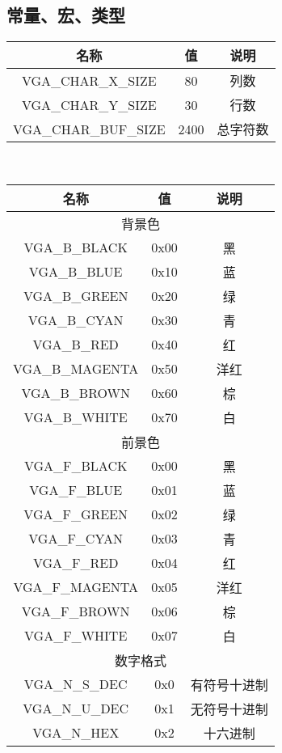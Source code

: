 \subsection{常量、宏、类型}
\noindent\begin{tabular}{|c|c|c|}
    \hline
    名称 & 值 & 说明\\\hline
    VGA\_CHAR\_X\_SIZE & 80 & 列数\\\hline
    VGA\_CHAR\_Y\_SIZE & 30 & 行数\\\hline
    VGA\_CHAR\_BUF\_SIZE & 2400 & 总字符数\\\hline
\end{tabular}\\
\begin{tabular}{|c|c|c|}
    \hline
    名称 & 值 & 说明\\\hline
    \multicolumn{3}{|c|}{背景色}\\\hline
    VGA\_B\_BLACK & 0x00 & 黑\\\hline
    VGA\_B\_BLUE & 0x10 & 蓝\\\hline
    VGA\_B\_GREEN & 0x20 & 绿\\\hline
    VGA\_B\_CYAN & 0x30 & 青\\\hline
    VGA\_B\_RED & 0x40 & 红\\\hline
    VGA\_B\_MAGENTA & 0x50 & 洋红\\\hline
    VGA\_B\_BROWN & 0x60 & 棕\\\hline
    VGA\_B\_WHITE & 0x70 & 白\\\hline
    \multicolumn{3}{|c|}{前景色}\\\hline
    VGA\_F\_BLACK & 0x00 & 黑\\\hline
    VGA\_F\_BLUE & 0x01 & 蓝\\\hline
    VGA\_F\_GREEN & 0x02 & 绿\\\hline
    VGA\_F\_CYAN & 0x03 & 青\\\hline
    VGA\_F\_RED & 0x04 & 红\\\hline
    VGA\_F\_MAGENTA & 0x05 & 洋红\\\hline
    VGA\_F\_BROWN & 0x06 & 棕\\\hline
    VGA\_F\_WHITE & 0x07 & 白\\\hline
    \multicolumn{3}{|c|}{数字格式}\\\hline
    VGA\_N\_S\_DEC & 0x0 & 有符号十进制\\\hline
    VGA\_N\_U\_DEC & 0x1 & 无符号十进制\\\hline
    VGA\_N\_HEX & 0x2 & 十六进制\\\hline
\end{tabular}\\
